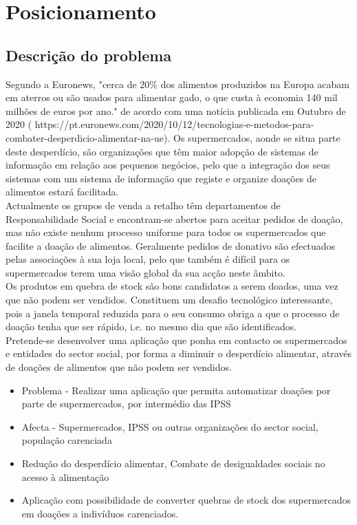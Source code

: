 \section{Posicionamento}

\subsection{Descrição do problema}
Segundo a Euronews, "cerca de 20\% dos alimentos produzidos na Europa acabam em aterros ou são usados para alimentar gado, o que custa à economia 140 mil milhões de euros por ano." de acordo com uma notícia publicada em Outubro de 2020  ( https://pt.euronews.com/2020/10/12/tecnologias-e-metodos-para-combater-desperdicio-alimentar-na-ue). Os supermercados, aonde se situa parte deste desperdício, são organizações que têm maior adopção de sistemas de informação em relação aos pequenos negócios, pelo que a integração dos seus sistemas com um sistema de informação que registe e organize doações de alimentos estará facilitada.\\

Actualmente os grupos de venda a retalho têm departamentos de Responsabilidade Social e encontram-se abertos para aceitar pedidos de doação, mas não existe nenhum processo uniforme para todos os supermercados que facilite a doação de alimentos. Geralmente pedidos de donativo são efectuados pelas associações à sua loja local, pelo que também é difícil para os supermercados terem uma visão global da sua acção neste âmbito.\\

Os produtos em quebra de stock são bons candidatos a serem doados, uma vez que não podem ser vendidos. Constituem um desafio tecnológico interessante, pois a janela temporal reduzida para o seu consumo obriga a que o processo de doação tenha que ser rápido, i.e. no mesmo dia que são identificados.\\

Pretende-se desenvolver uma aplicação que ponha em contacto os supermercados e entidades do sector social, por forma a diminuir o desperdício alimentar, através de doações de alimentos que não podem ser vendidos.\\
\begin{itemize}
	\item Problema - Realizar uma aplicação que permita automatizar doações por parte de supermercados, por intermédio das IPSS
	\item Afecta - Supermercados, IPSS ou outras organizações do sector social, população carenciada
	\item Redução do desperdício alimentar, Combate de desigualdades sociais no acesso à alimentação
	\item Aplicação com possibilidade de converter quebras de stock dos supermercados em doações a indivíduos carenciados.
\end{itemize}

